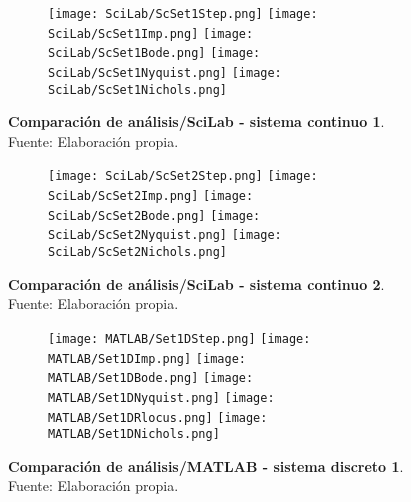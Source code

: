     \begin{figure}[htb]
        \centering
        \begin{subfigure}[t]{0.99\textwidth}
            \centering
            \texttt{[image: SciLab/ScSet1Step.png]}
            \texttt{[image: SciLab/ScSet1Imp.png]}
            \texttt{[image: SciLab/ScSet1Bode.png]}
            \texttt{[image: SciLab/ScSet1Nyquist.png]}
            \texttt{[image: SciLab/ScSet1Nichols.png]}
            \label{fig:ScSet1sub}
        \end{subfigure}
        \caption[Comparación de análisis/SciLab - sistema continuo 1]{\textbf{Comparación de análisis/SciLab - sistema continuo 1}. Fuente: Elaboración propia. \label{fig:ScSet1}}
    \end{figure}

    \begin{figure}[htb]
        \centering
        \begin{subfigure}[t]{0.99\textwidth}
            \centering
            \texttt{[image: SciLab/ScSet2Step.png]}
            \texttt{[image: SciLab/ScSet2Imp.png]}
            \texttt{[image: SciLab/ScSet2Bode.png]}
            \texttt{[image: SciLab/ScSet2Nyquist.png]}
            \texttt{[image: SciLab/ScSet2Nichols.png]}
            \label{fig:ScSet2sub}
        \end{subfigure}
        \caption[Comparación de análisis/SciLab - sistema continuo 2]{\textbf{Comparación de análisis/SciLab - sistema continuo 2}. Fuente: Elaboración propia. \label{fig:ScSet2}}
    \end{figure}

    \begin{figure}[htb]
        \centering
        \begin{subfigure}[t]{0.99\textwidth}
            \centering
            \texttt{[image: MATLAB/Set1DStep.png]}
            \texttt{[image: MATLAB/Set1DImp.png]}
            \texttt{[image: MATLAB/Set1DBode.png]}
            \texttt{[image: MATLAB/Set1DNyquist.png]}
            \texttt{[image: MATLAB/Set1DRlocus.png]}
            \texttt{[image: MATLAB/Set1DNichols.png]}
            \label{fig:Set1Dsub}
        \end{subfigure}
        \caption[Comparación de análisis/MATLAB - sistema discreto 1]{\textbf{Comparación de análisis/MATLAB - sistema discreto 1}. Fuente: Elaboración propia. \label{fig:Set1D}}
    \end{figure}

